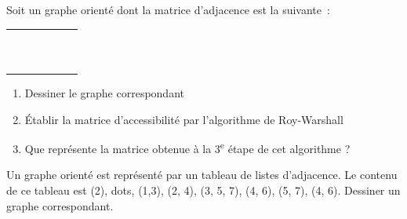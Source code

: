 	\begin{Exercice}{}
		Soit un graphe orienté dont la matrice d'adjacence est la suivante~:
				
		\begin{center}
			\tablefirsthead{}
			\tablehead{}
			\tabletail{}
			\tablelasttail{}
			\begin{supertabular}{m{0.93900007cm}|m{0.81600004cm}|m{0.81600004cm}|m{0.81600004cm}|m{0.81600004cm}|m{0.81600004cm}|}
			 &
			 &
			 &
			 &
			 &
			\\\hhline{~-----}
			 &
			 &
			 &
			 &
			 &
			\centering{}\\\hhline{~-----}
			 &
			 &
			 &
			 &
			 &
			\centering{}\\\hhline{~-----}
			 &
			 &
			 &
			 &
			 &
			\centering{}\\\hhline{~-----}
			 &
			 &
			 &
			 &
			 &
			\centering{}\\\hhline{~-----}
			 &
			 &
			 &
			 &
			 &
			\centering{}\\\hhline{~-----}
			\end{supertabular}
		\end{center}
		
		\begin{enumerate}
			\item {
				Dessiner le graphe correspondant}
			\item {
				Établir la matrice d'accessibilité par l'algorithme de Roy-Warshall}
			\item {
				Que représente la matrice obtenue à la 3\textsuperscript{e} étape de cet algorithme ?}
		\end{enumerate}
		
	\end{Exercice}
	
	\begin{Exercice}{}
		Un graphe orienté est représenté par un tableau de 
		listes d'adjacence. Le contenu de ce tableau est
		(2), {dots}, (1,3), (2, 4), (3, 5, 7), (4, 6), (5, 7), (4, 6). 
		Dessiner un graphe correspondant.

	\end{Exercice}
	
